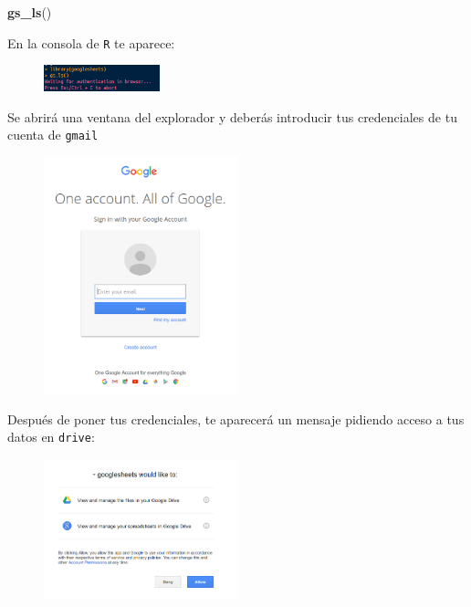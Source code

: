 \documentclass[]{article}
\newenvironment{Shaded}{\begin{snugshade}}{\end{snugshade}}
\newcommand{\KeywordTok}[1]{\textcolor[rgb]{0.13,0.29,0.53}{\textbf{#1}}}
\newcommand{\NormalTok}[1]{#1}
\begin{document}
\begin{Shaded}
\begin{Highlighting}[]
\KeywordTok{gs_ls}\NormalTok{()}
\end{Highlighting}
\end{Shaded}

En la consola de \texttt{R} te aparece:

\begin{figure}[H]
\centering
\includegraphics[width=0.3\textwidth]{../img/gs_oauth1.png}
\end{figure}

Se abrirá una ventana del explorador y deberás introducir tus
credenciales de tu cuenta de \texttt{gmail}

\begin{figure}[H]
\centering
\includegraphics[width=0.5\textwidth]{../img/gs_oauth2.png}
\end{figure}

Después de poner tus credenciales, te aparecerá un mensaje pidiendo
acceso a tus datos en \texttt{drive}:

\begin{figure}[H]
\centering
\includegraphics[width=0.5\textwidth]{../img/gs_oauth3.png}
\end{figure}
\end{document}
